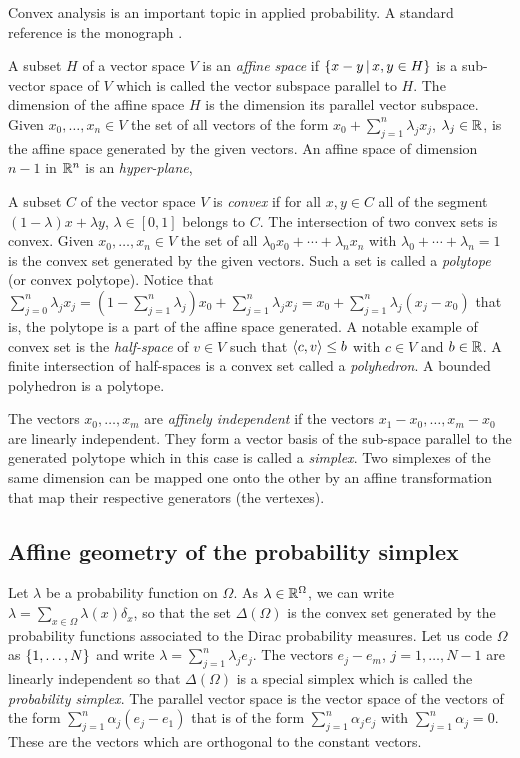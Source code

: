 \documentclass[12pt,a4paper]{amsart}
\theoremstyle{plain}%
\theoremstyle{definition}
\theoremstyle{remark}
\begin{document}
Convex analysis is an important topic in applied probability. A
standard reference is the monograph \cite{barvinok:2002}.

A subset $H$ of a vector space $V$ is an \emph{affine space} if
$\left\{x-y \, \middle| \, x,y \in H \right\}$ is a sub-vector space of $V$ which is called
the vector subspace parallel to $H$. The dimension of the affine space
$H$ is the dimension its parallel vector subspace. Given
$x_0,\dots,x_n \in V$ the set of all vectors of the form
$x_0 + \sum_{j=1}^n \lambda_j x_j$, $\lambda_j \in \mathbb{R}$, is the
affine space generated by the given vectors. An affine space of
dimension $n-1$ in $\mathbb{R}^n$ is an \emph{hyper-plane},

A subset $C$ of the vector space $V$ is \emph{convex} if for all $x,y \in C$ all of the segment $(1-\lambda)x + \lambda y$, $\lambda \in [0,1]$ belongs to $C$. The intersection of two convex sets is convex. Given $x_0,\dots,x_n \in V$ the set of all $\lambda_0 x_0 + \cdots +\lambda_n x_n$ with $\lambda_0 + \cdots + \lambda_n = 1$ is the convex set generated by the given vectors. Such a set is called a \emph{polytope} (or convex polytope). Notice that $\sum_{j=0}^n \lambda_j x_j = (1 - \sum_{j=1}^n \lambda_j) x_0 + \sum_{j=1}^n \lambda_j x_j = x_0 + \sum_{j=1}^n \lambda_j(x_j-x_0)$ that is, the polytope is a part of the affine space generated. A notable example of convex set is the \emph{half-space} of $v \in V$ such that $\left\langle c,v\right\rangle \leq b$ with $c \in V$ and $b \in \mathbb{R}$. A finite intersection of half-spaces is a convex set called a \emph{polyhedron}. A bounded polyhedron is a polytope. 

The vectors $x_0,\dots,x_m$ are \emph{affinely independent} if the vectors $x_1-x_0,\dots,x_m-x_0$ are linearly independent. They form a vector basis of the sub-space parallel to the generated polytope which in this case is called a \emph{simplex}. Two simplexes of the same dimension can be mapped one onto the other by an affine transformation that map their respective generators (the vertexes).    


\subsection{Affine geometry of the probability simplex}
\label{sec:probability-simplex}

Let $\lambda$ be a probability function on $\Omega$. As $\lambda \in \mathbb{R}^\Omega$, we can write $\lambda = \sum_{x \in \Omega} \lambda(x) \delta_x$, so that the set $\Delta(\Omega)$ is the convex set generated by the probability functions associated to the Dirac probability measures. Let us code $\Omega$ as $\left\{1,\dots,N\right\}$ and write $\lambda= \sum_{j=1}^n \lambda_j e_j$. The vectors $e_j - e_m$, $j=1,\dots,N-1$ are linearly independent so that $\Delta(\Omega)$ is a special simplex which is called the \emph{probability simplex}. The parallel vector space is the vector space of the vectors of the form $\sum_{j=1}^n \alpha_j (e_j-e_1)$ that is of the form $\sum_{j=1}^n \alpha_j e_j$ with $\sum_{j=1}^n \alpha_j =0$. These are the vectors which are orthogonal to the constant vectors.
\end{document}
